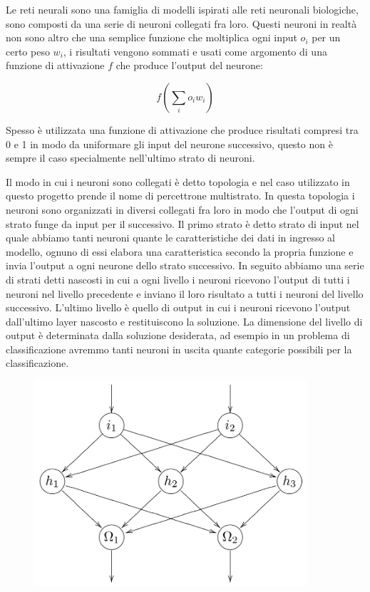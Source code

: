 \documentclass[a4paper,12pt]{report}
\begin{document}
Le reti neurali sono una famiglia di modelli ispirati alle reti neuronali
biologiche, sono composti da una serie di neuroni collegati fra loro. Questi
neuroni in realtà non sono altro che una semplice funzione che moltiplica ogni
input $o_i$ per un certo peso $w_i$, i risultati vengono sommati e usati come
argomento di una funzione di attivazione $f$ che produce l'output del neurone:

$$
f(\sum_i o_i w_i)
$$

Spesso è utilizzata una funzione di attivazione che produce risultati compresi
tra 0 e 1 in modo da uniformare gli input del neurone successivo, questo non è
sempre il caso specialmente nell'ultimo strato di neuroni.

Il modo in cui i neuroni sono collegati è detto topologia e nel caso utilizzato
in questo progetto prende il nome di percettrone multistrato. In questa
topologia i neuroni sono organizzati in diversi collegati fra loro in modo che
l'output di ogni strato funge da input per il successivo. Il primo strato è
detto strato di input nel quale abbiamo tanti neuroni quante le caratteristiche
dei dati in ingresso al modello, ognuno di essi elabora una caratteristica
secondo la propria funzione e invia l'output a ogni neurone dello strato
successivo. In seguito abbiamo una serie di strati detti nascosti in cui a ogni
livello i neuroni ricevono l'output di tutti i neuroni nel livello precedente e
inviano il loro risultato a tutti i neuroni del livello successivo. L'ultimo
livello è quello di output in cui i neuroni ricevono l'output dall'ultimo layer
nascosto e restituiscono la soluzione. La dimensione del livello di output è
determinata dalla soluzione desiderata, ad esempio in un problema di
classificazione avremmo tanti neuroni in uscita quante categorie possibili per
la classificazione.

\begin{figure}[h]
	\includegraphics[width = 0.9\textwidth]{Immagini/MLP diagramma.png}
\end{figure}
\newpage
\end{document}
